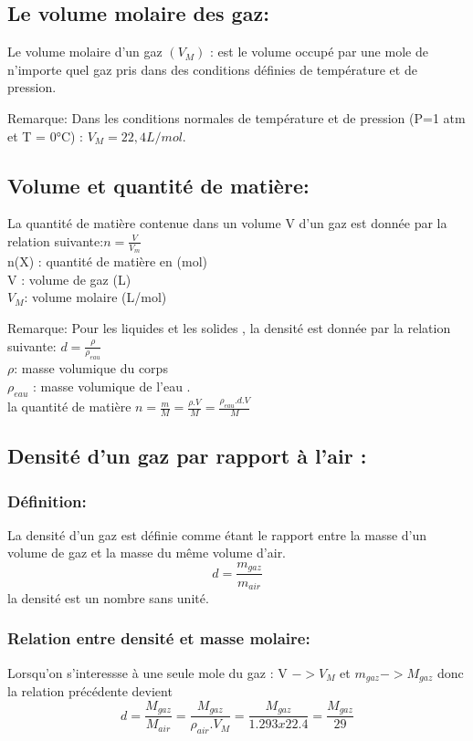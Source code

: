 \documentclass[12pt]{article}
\begin{document}
\subsection{Le volume molaire des gaz:}
Le volume molaire d'un gaz $( V_M )$ : est le volume occupé par une mole de n'importe quel gaz pris dans des
conditions définies de température et de pression.

Remarque: Dans les conditions normales de température et de pression (P=1 atm et T = 0°C) : $V_M=22,4L/mol$.

\subsection{Volume et quantité de matière:}
La quantité de matière contenue dans un volume V d'un gaz est donnée par la relation suivante:$n = \frac{V}{V_m}$
\\n(X) : quantité de matière en (mol)
\\V    : volume de gaz  (L)
\\$V_M$: volume molaire   (L/mol)

Remarque: Pour les liquides et les solides , la densité est donnée par la relation suivante: $d = \frac{\rho}{\rho_{eau}}$ 
\\$\rho$: masse volumique du corps 
\\$\rho_{eau}$ : masse volumique de l'eau .
\\la quantité de matière $n = \frac{m}{M} = \frac{\rho.V}{M} = \frac{\rho_{eau}.d.V}{M}$
\subsection{Densité d'un gaz par rapport à l'air : }
\subsubsection{Définition:}
La densité d'un gaz est définie comme étant le rapport entre la masse d'un volume de gaz et la masse du même volume d’air. $$d = \frac{m_{gaz}}{m_{air}}$$ la densité est un nombre sans unité.
\subsubsection{Relation entre densité et masse molaire: }
Lorsqu'on s'interessse à une seule mole du gaz : V $->V_M$ et $m_{gaz}->M_{gaz}$ donc la relation précédente devient $$d = \frac{M_{gaz}}{M_{air}} = \frac{M_{gaz}}{\rho_{air}.V_M} = \frac{M_{gaz}}{1.293x22.4} = \frac{M_{gaz}}{29}$$
\end{document}
